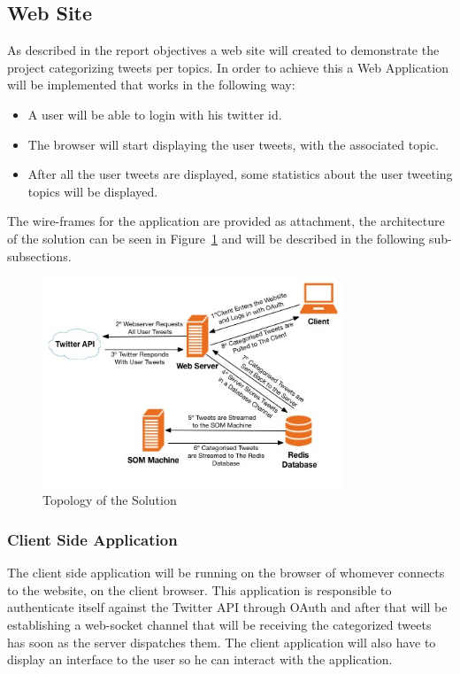 \subsection{Web Site} %
\label{sub:web_site_creation}
As described in the report objectives a web site will created to demonstrate the project categorizing tweets per topics. In order to achieve this a Web Application will be implemented that works in the following way:
\begin{itemize}
  \item A user will be able to login with his twitter id.
  \item The browser will start displaying the user tweets, with the associated topic.
  \item After all the user tweets are displayed, some statistics about the user tweeting topics will be displayed.
\end{itemize}
The wire-frames for the application are provided as attachment, the architecture of the solution can be seen in Figure~\ref{fig:solution} and will be described in the following sub-subsections.
\begin{figure}[tb]
  \begin{center}
    \includegraphics[width=9cm]{images/12_network.jpg}
  \end{center}
  \caption{Topology of the Solution}
  \label{fig:solution}
\end{figure}

\subsubsection{Client Side Application} %
\label{ssub:client_side_application}
The client side application will be running on the browser of whomever connects to the website, on the client browser. This application is responsible to authenticate itself against the Twitter API through OAuth and after that will be establishing a web-socket channel that will be receiving the categorized tweets has soon as the server dispatches them. The client application will also have to display an interface to the user so he can interact with the application.

